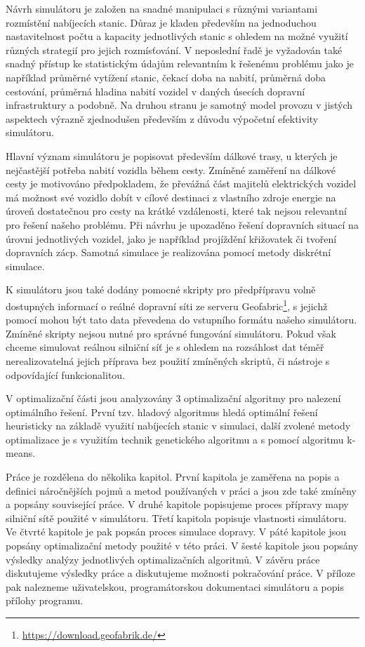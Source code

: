 Návrh simulátoru je založen na snadné manipulaci s různými variantami rozmístění
nabíjecích stanic. Důraz je kladen především na jednoduchou nastavitelnost 
počtu a kapacity jednotlivých stanic s ohledem na možné využití různých 
strategií pro jejich rozmísťování. V neposlední řadě je vyžadován také snadný 
přístup ke statistickým údajům relevantním k řešenému problému jako je například
průměrné vytížení stanic, čekací doba na nabití, průměrná doba cestování,
průměrná hladina nabití vozidel v daných úsecích dopravní infrastruktury a 
podobně. Na druhou stranu je samotný model provozu v jistých aspektech výrazně 
zjednodušen především z důvodu výpočetní efektivity simulátoru.

Hlavní význam simulátoru je popisovat především dálkové trasy, u kterých 
je nejčastější potřeba nabití vozidla během cesty. Zmíněné zaměření na 
dálkové cesty je motivováno předpokladem, že převážná část majitelů elektrických
vozidel má možnost své vozidlo dobít v cílové destinaci z vlastního zdroje energie 
na úroveň dostatečnou pro cesty na krátké vzdálenosti, které tak nejsou 
relevantní pro řešení našeho problému. Při návrhu je upozaděno řešení dopravních
situací na úrovni jednotlivých vozidel, jako je například projíždění křižovatek 
či tvoření dopravních zácp. Samotná simulace je realizována pomocí metody
diskrétní simulace.

K simulátoru jsou také dodány pomocné skripty pro předpřípravu volně dostupných
informací o reálné dopravní síti ze serveru Geofabric\footnote{\url{https://download.geofabrik.de/}},
s jejichž pomocí mohou být tato data převedena do vstupního formátu našeho 
simulátoru. Zmíněné skripty nejsou nutné pro správné fungování simulátoru. 
Pokud však chceme simulovat reálnou silniční síť je s ohledem na rozsáhlost dat 
téměř nerealizovatelná jejich příprava bez použití zmíněných skriptů, či 
nástroje s odpovídající funkcionalitou. 

V optimalizační části jsou analyzovány 3 optimalizační algoritmy pro nalezení
optimálního řešení. První tzv. hladový algoritmus hledá optimální řešení 
heuristicky na základě využití nabíjecích stanic v simulaci, 
další zvolené metody optimalizace je s využitím technik genetického algoritmu
a s pomocí algoritmu k-means.

Práce je rozdělena do několika kapitol. První kapitola je zaměřena na popis a definici
náročnějších pojmů a metod používaných v práci a jsou zde také zmíněny a popsány
související práce. V druhé kapitole popisujeme
proces přípravy mapy silniční sítě použité v simulátoru. Třetí kapitola popisuje
vlastnosti simulátoru. Ve čtvrté kapitole je pak popsán proces simulace dopravy.
V páté kapitole jsou popsány optimalizační metody použité v této práci. 
V šesté kapitole jsou popsány výsledky analýzy jednotlivých optimalizačních algoritmů.
V závěru práce diskutujeme výsledky práce a diskutujeme možnosti pokračování práce.
V příloze pak nalezneme uživatelskou, programátorskou dokumentaci simulátoru a
popis přílohy programu.



